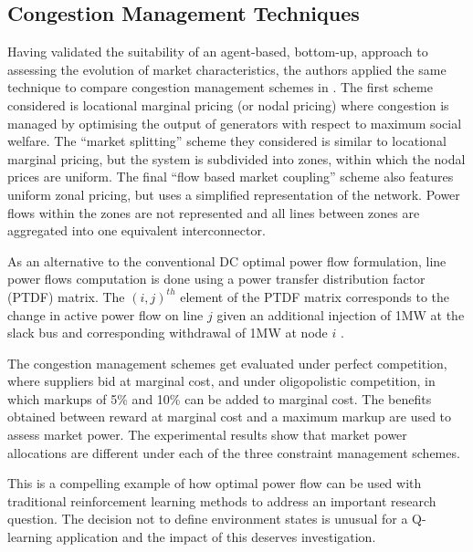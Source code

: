 \subsection{Congestion Management Techniques}
\label{sec:related_cong}
Having validated the suitability of an agent-based, bottom-up, approach to
assessing the evolution of market characteristics, the authors applied the same
technique to compare congestion management schemes in .
The first scheme considered is locational marginal pricing (or nodal
pricing) where congestion is managed by optimising the output of generators
with respect to maximum social welfare.
The ``market splitting'' scheme they considered is similar to locational
marginal pricing, but the system is subdivided into zones, within which the
nodal prices are uniform.  The final ``flow based market coupling'' scheme
also features uniform zonal pricing, but uses a simplified representation
of the network.  Power flows within the zones are not represented and all lines
between zones are aggregated into one equivalent interconnector.

As an alternative to the conventional DC optimal power flow formulation, line
power flows computation is done using a power transfer distribution
factor (PTDF) matrix.  The $(i,j)^{th}$ element of the PTDF matrix corresponds
to the change in active power flow on line $j$ given an additional injection of
1MW at the slack bus and corresponding withdrawal of 1MW at node $i$
\cite{grainger:psa}.

The congestion management schemes get evaluated under perfect competition,
where suppliers bid at marginal cost, and under oligopolistic competition, in
which markups of 5\% and 10\% can be added to marginal cost.  The benefits
obtained between reward at marginal cost and a maximum markup are used to
assess market power.  The experimental results show that market power
allocations are different under each of the three constraint management
schemes.

This is a compelling example of how optimal power flow can be used with
traditional reinforcement learning methods to address an important research
question.  The decision not to define environment states is unusual for a
Q-learning application and the impact of this deserves investigation.

